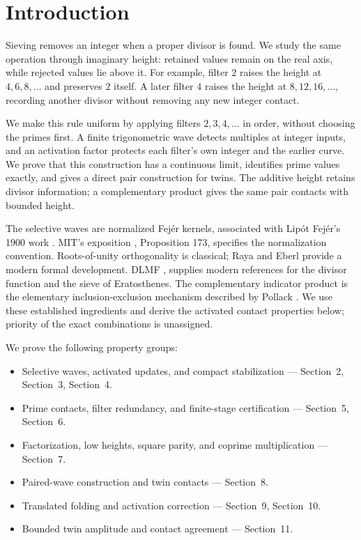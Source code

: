 \section{Introduction}
Sieving removes an integer when a proper divisor is found. We study the
same operation through imaginary height: retained values remain on the real
axis, while rejected values lie above it. For example, filter $2$ raises the
height at $4,6,8,\ldots$ and preserves $2$ itself. A later filter $4$ raises
the height at $8,12,16,\ldots$, recording another divisor without removing
any new integer contact.

We make this rule uniform by applying filters $2,3,4,\ldots$ in order,
without choosing the primes first. A finite trigonometric wave detects
multiples at integer inputs, and an activation factor protects each filter's
own integer and the earlier curve. We prove that this construction has a
continuous limit, identifies prime values exactly, and gives a direct pair
construction for twins. The additive height retains divisor information;
a complementary product gives the same pair contacts with bounded height.

The selective waves are normalized Fejér kernels, associated with Lipót
Fejér's 1900 work \cite{fejer1900}. MIT's exposition \cite{mit2021}, Proposition 173,
specifies the normalization convention. Roots-of-unity orthogonality is
classical; Raya and Eberl \cite{rayaeberl2019} provide a modern formal development.
DLMF \cite{dlmfdivisors}, \cite{dlmfsieve} supplies modern references for the divisor
function and the sieve of Eratosthenes. The complementary indicator product
is the elementary inclusion-exclusion mechanism described by Pollack
\cite{pollack2009}. We use these established ingredients and derive the activated
contact properties below; priority of the exact combinations is unassigned.

\begin{samepage}
We prove the following property groups:

\begin{itemize}
\item Selective waves, activated updates, and compact stabilization — Section~2, Section~3, Section~4.
\item Prime contacts, filter redundancy, and finite-stage certification — Section~5, Section~6.
\item Factorization, low heights, square parity, and coprime multiplication — Section~7.
\item Paired-wave construction and twin contacts — Section~8.
\item Translated folding and activation correction — Section~9, Section~10.
\item Bounded twin amplitude and contact agreement — Section~11.
\end{itemize}
\end{samepage}
